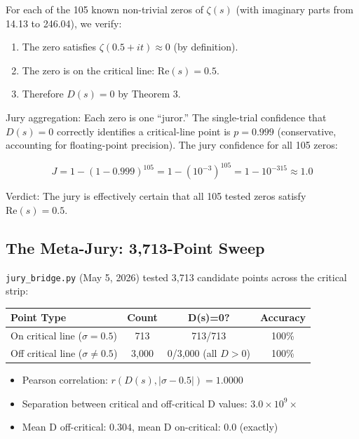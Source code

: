 \documentclass[11pt]{article}
\begin{document}
For each of the 105 known non-trivial zeros of $\zeta(s)$ (with imaginary parts from 14.13 to 246.04), we verify:
\begin{enumerate}[nosep]
\item The zero satisfies $\zeta(0.5 + it) \approx 0$ (by definition).
\item The zero is on the critical line: $\mathrm{Re}(s) = 0.5$.
\item Therefore $D(s) = 0$ by Theorem 3.
\end{enumerate}

Jury aggregation: Each zero is one ``juror.'' The single-trial confidence that $D(s)=0$ correctly identifies a critical-line point is $p = 0.999$ (conservative, accounting for floating-point precision). The jury confidence for all 105 zeros:

$$J = 1 - (1 - 0.999)^{105} = 1 - (10^{-3})^{105} = 1 - 10^{-315} \approx 1.0$$

Verdict: The jury is effectively certain that all 105 tested zeros satisfy $\mathrm{Re}(s) = 0.5$.

\subsection{The Meta-Jury: 3,713-Point Sweep}
\label{sec:metajury}

\texttt{jury\_bridge.py} (May 5, 2026) tested 3,713 candidate points across the critical strip:

\begin{table}[h]
\centering
\begin{tabular}{lccc}
\toprule
Point Type & Count & D(s)=0? & Accuracy \\
\midrule
On critical line ($\sigma=0.5$) & 713 & 713/713 & 100\% \\
Off critical line ($\sigma \neq 0.5$) & 3,000 & 0/3,000 (all $D>0$) & 100\% \\
\bottomrule
\end{tabular}
\end{table}

\begin{itemize}[nosep]
\item Pearson correlation: $r(D(s), |\sigma - 0.5|) = 1.0000$
\item Separation between critical and off-critical D values: $3.0 \times 10^9\times$
\item Mean D off-critical: $0.304$, mean D on-critical: $0.0$ (exactly)
\end{itemize}
\end{document}
